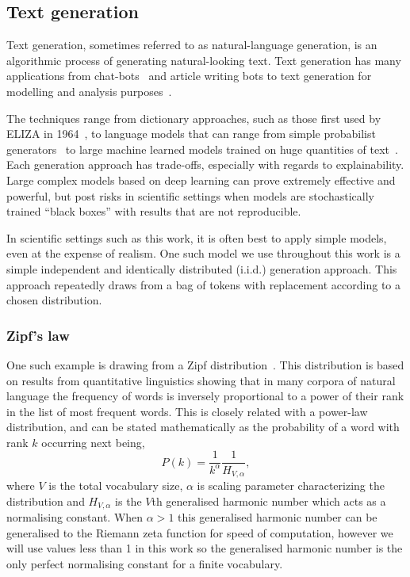 \subsection{Text generation}\label{sec:textgeneration}

Text generation, sometimes referred to as natural-language generation, is an algorithmic process of generating natural-looking text. Text generation has many applications from chat-bots~\cite{MauldinChatterbots1994} and article writing bots to text generation for modelling and analysis purposes~\cite{Touseefsurvey2020}.

The techniques range from dictionary approaches, such as those first used by ELIZA in 1964~\cite{weizenbaum_computer_1976}, to language models that can range from simple probabilist generators~\cite{reiter2000building} to large machine learned models trained on huge quantities of text~\cite{perera2017recent}. Each generation approach has trade-offs, especially with regards to explainability. Large complex models based on deep learning can prove extremely effective and powerful, but post risks in scientific settings when models are stochastically trained ``black boxes'' with results that are not reproducible.

In scientific settings such as this work, it is often best to apply simple models, even at the expense of realism. One such model we use throughout this work is a simple independent and identically distributed (i.i.d.) generation approach. This approach repeatedly draws from a bag of tokens with replacement according to a chosen distribution. 

\subsubsection{Zipf's law}
One such example is drawing from a Zipf distribution~\cite{george1935zipf,zipf_human_1949}. This distribution is based on results from quantitative linguistics showing that in many corpora of natural language the frequency of words is inversely proportional to a power of their rank in the list of most frequent words. This is closely related with a power-law distribution, and can be stated mathematically as the probability of a word with rank $k$ occurring next being,
\begin{equation}
P(k) = \frac{1}{k^\alpha}\frac{1}{H_{V,\alpha}},
\end{equation}
where $V$ is the total vocabulary size, $\alpha$ is scaling parameter characterizing the distribution and $H_{V,\alpha}$ is the $V$th generalised harmonic number which acts as a normalising constant. When $\alpha>1$ this generalised harmonic number can be generalised to the Riemann zeta function for speed of computation, however we will use values less than 1 in this work so the generalised harmonic number is the only perfect normalising constant for a finite vocabulary.  

